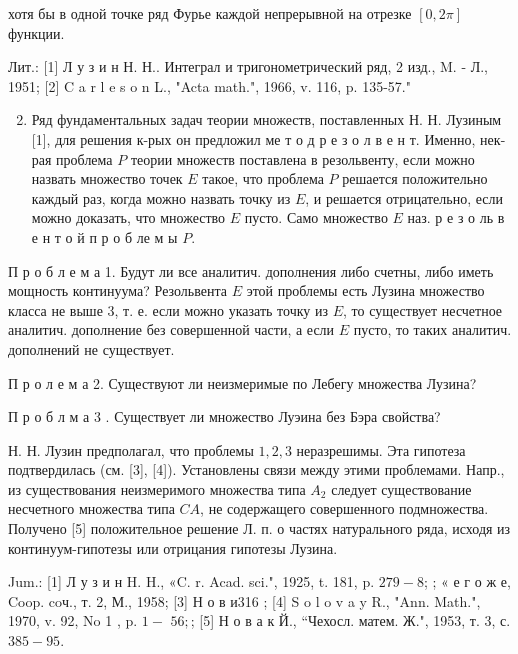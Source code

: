 \documentclass[10pt]{article}
\begin{document}
хотя бы в одной точке ряд Фурье каждой непрерывной на отрезке $[0,2 \pi]$ функции.



Лит.: [1] Л у з и н Н. Н.. Интеграл и тригонометрический ряд, 2 изд., M. - Л., 1951; [2] C a r l e s o n L., "Acta math.", 1966, v. 116, p. 135-57."



\begin{enumerate}

  \setcounter{enumi}{1}

  \item Ряд фундаментальных задач теории множеств, поставленных Н. Н. Лузиным [1], для решения к-рых он предложил ме т о д р е з о л в е н т. Именно, нек-рая проблема $P$ теории множеств поставлена в резольвенту, если можно назвать множество точек $E$ такое, что проблема $P$ решается положительно каждый раз, когда можно назвать точку из $E$, и решается отрицательно, если можно доказать, что множество $E$ пусто. Само множество $E$ наз. р е з о ль в е н т о й п р о б ле м ы $P$.

\end{enumerate}



П р о б л е м а 1. Будут ли все аналитич. дополнения либо счетны, либо иметь мощность континуума? Резольвента $E$ этой проблемы есть Лузина множество класса не выше 3, т. е. если можно указать точку из $E$, то существует несчетное аналитич. дополнение без совершенной части, а если $E$ пусто, то таких аналитич. дополнений не существует.



П р о л е м а 2. Существуют ли неизмеримые по Лебегу множества Лузина?



П р о б л м а 3 . Существует ли множество Луэина без Бэра свойства?



Н. Н. Лузин предполагал, что проблемы $1,2,3$ неразрешимы. Эта гипотеза подтвердилась (см. [3], [4]). Установлены связи между этими проблемами. Напр., из существования неизмеримого множества типа $A_{2}$ следует существование несчетного множества типа $C A$, не содержащего совершенного подмножества. Получено [5] положительное решение Л. п. о частях натурального ряда, исходя из континуум-гипотезы или отрицания гипотезы Лузина.



Jum.: [1] Л у з и н H. H., «C. r. Acad. sci.", 1925, t. 181, p. $279-8$; ; « е г о ж е, Coop. coч., т. 2, М., 1958; [3] Н о в и316 ; [4] S o l o v a y R., "Ann. Math.", 1970, v. 92, No 1 , p. $1-$ $56 ;$; [5] Н о в а к Й., “Чехосл. матем. Ж.", 1953, т. 3, с. $385-95$.
\end{document}

